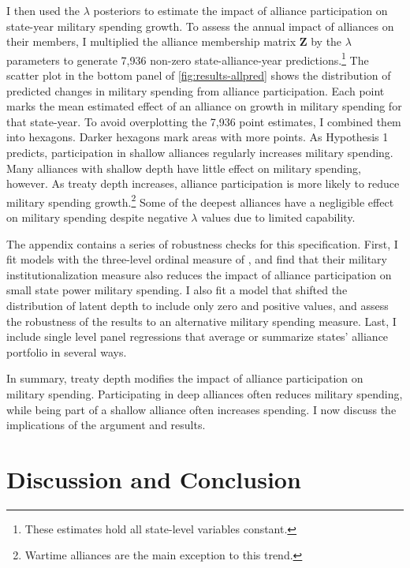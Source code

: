 \documentclass[12pt]{article}
\begin{document}
I then used the $\lambda$ posteriors to estimate the impact of alliance participation on state-year military spending growth. 
To assess the annual impact of alliances on their members, I multiplied the alliance membership matrix $\textbf{Z}$ by the $\lambda$ parameters to generate 7,936 non-zero state-alliance-year predictions.\footnote{These estimates hold all state-level variables constant.} 
The scatter plot in the bottom panel of \autoref{fig:results-allpred} shows the distribution of predicted changes in military spending from alliance participation.
Each point marks the mean estimated effect of an alliance on growth in military spending for that state-year.
To avoid overplotting the 7,936 point estimates, I combined them into hexagons. 
Darker hexagons mark areas with more points. 
As Hypothesis 1 predicts, participation in shallow alliances regularly increases military spending. 
Many alliances with shallow depth have little effect on military spending, however. 
As treaty depth increases, alliance participation is more likely to reduce military spending growth.\footnote{Wartime alliances are the main exception to this trend.}
Some of the deepest alliances have a negligible effect on military spending despite negative $\lambda$ values due to limited capability. 


The appendix contains a series of robustness checks for this specification.
First, I fit models with the three-level ordinal measure of \citep{LeedsAnac2005}, and find that their military institutionalization measure also reduces the impact of alliance participation on small state power military spending. 
I also fit a model that shifted the distribution of latent depth to include only zero and positive values, and assess the robustness of the results to an alternative military spending measure. 
Last, I include single level panel regressions that average or summarize states' alliance portfolio in several ways. 


In summary, treaty depth modifies the impact of alliance participation on military spending.  
Participating in deep alliances often reduces military spending, while being part of a shallow alliance often increases spending. 
I now discuss the implications of the argument and results. 



\section{Discussion and Conclusion}
\end{document}
